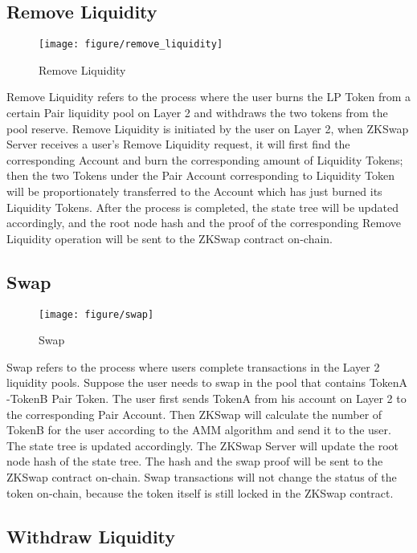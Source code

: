 \documentclass[]{template/llncs}
\begin{document}
\subsection{Remove Liquidity }

\begin{figure}[htbp]
\centering
\texttt{[image: figure/remove\_liquidity]}
\caption{Remove Liquidity}
\label{fig:remove_liquidity}
\end{figure}

Remove Liquidity refers to the process where the user burns the LP Token from a certain Pair liquidity pool on Layer 2 and withdraws the two tokens from the pool reserve. Remove Liquidity is initiated by the user on Layer 2, when ZKSwap Server receives a user’s Remove Liquidity request, it will first find the corresponding Account and burn the corresponding amount of Liquidity Tokens; then the two Tokens under the Pair Account corresponding to Liquidity Token will be proportionately transferred to the Account which has just burned its Liquidity Tokens. After the process is completed, the state tree will be updated accordingly, and the root node hash and the proof of the corresponding Remove Liquidity operation will be sent to the ZKSwap contract on-chain.

\pagebreak


\subsection{Swap }

\begin{figure}[htbp]
\centering
\texttt{[image: figure/swap]}
\caption{Swap}
\label{fig:swap}
\end{figure}

Swap refers to the process where users complete transactions in the Layer 2 liquidity pools. Suppose the user needs to swap in the pool that contains TokenA -TokenB Pair Token. The user first sends TokenA from his account on Layer 2 to the corresponding Pair Account. Then ZKSwap will calculate the number of TokenB for the user according to the AMM algorithm and send it to the user. The state tree is updated accordingly. The ZKSwap Server will update the root node hash of the state tree. The hash and the swap proof will be sent to the ZKSwap contract on-chain. Swap transactions will not change the status of the token on-chain, because the token itself is still locked in the ZKSwap contract.


\subsection{Withdraw Liquidity}
\end{document}
